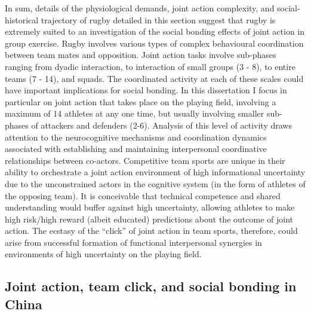 \begin{CJK}{UTF8}{gbsn}
In sum, details of the physiological demands, joint action complexity, and social-historical trajectory of rugby detailed in this section suggest that rugby is extremely suited to an investigation of the social bonding effects of joint action in group exercise.  Rugby involves various types of complex behavioural coordination between team mates and opposition.  Joint action tasks involve sub-phases ranging from dyadic interaction, to interaction of small groups (3 - 8), to entire teams (7 - 14), and squads.  The coordinated activity at each of these scales could have important implications for social bonding.  In this dissertation I focus in particular on joint action that takes place on the playing field, involving a maximum of 14 athletes at any one time, but usually involving smaller sub-phases of attackers and defenders (2-6).  Analysis of this level of activity draws attention to the neurocognitive mechanisms and coordination dynamics associated with establishing and maintaining interpersonal coordinative relationships between co-actors.  Competitive team sports are unique in their ability to orchestrate a joint action environment of high informational uncertainty due to the unconstrained actors in the cognitive system (in the form of athletes of the opposing team).  It is conceivable that technical competence and shared understanding would buffer against high uncertainty, allowing athletes to make high risk/high reward (albeit educated) predictions about the outcome of joint action.  The ecstasy of the ``click'' of joint action in team sports, therefore, could arise from successful formation of functional interpersonal synergies in environments of high uncertainty on the playing field.



  \subsection{Joint action, team click, and social bonding in China}


\end{CJK}
